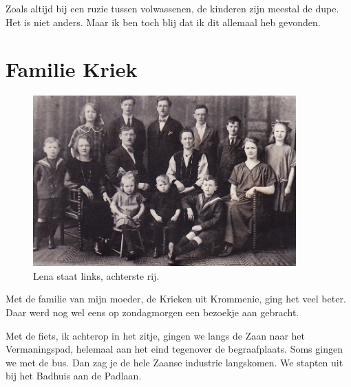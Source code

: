 \documentclass[12pt,twoside, openright]{memoir}
\begin{document}
Zoals altijd bij een ruzie tussen volwassenen, de kinderen zijn meestal de dupe. Het is niet anders. Maar ik ben toch blij dat ik dit allemaal heb gevonden.







\section*{Familie Kriek} %
\label{cha:familie_kriek}



\begin{figure}
\centering
\includegraphics[width=0.9\textwidth]{img/ch3/familie}
\caption*{\footnotesize Lena staat links, achterste rij.}
\end{figure}

Met de familie van mijn moeder, de Krieken uit Krommenie, ging het veel beter. Daar werd nog wel eens op zondagmorgen een bezoekje aan gebracht.   

Met de fiets, ik achterop in het zitje, gingen we langs de Zaan naar het Vermaningspad, helemaal aan het eind tegenover de begraafplaats. Soms gingen we met de bus. Dan zag je de hele Zaanse industrie langskomen. We stapten uit bij het Badhuis aan de Padlaan. 
\end{document}
